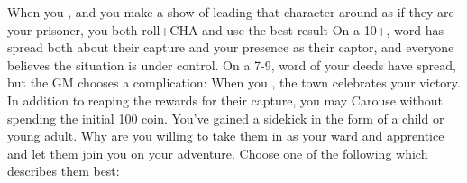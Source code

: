 \documentclass[darkmode]{dw_playbook}
\begin{document}
\pageThree
    {
        \advancedMovesCont
    }
    {
            {When you , and you make a show of leading that character around as if they are your prisoner, you both roll+CHA and use the best result  On a 10+, word has spread both about their capture and your presence as their captor, and everyone believes the situation is under control.  On a 7-9, word of your deeds have spread, but the GM chooses a complication:
            \gapSm
            \gapSm
            \gapSm
            \gap
            When you , the town celebrates your victory.  In addition to reaping the rewards for their capture, you may Carouse without spending the initial 100 coin.}
            {You’ve gained a sidekick in the form of a child or young adult.  Why are you willing to take them in as your ward and apprentice and let them join you on your adventure.  Choose one of the following which describes them best:
            \gap
            \gap
            \gap
            }}
\end{document}
